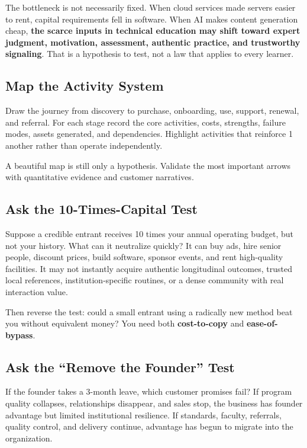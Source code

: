 The bottleneck is not necessarily fixed. When cloud services made servers easier to rent, capital requirements fell in software. When AI makes content generation cheap, \textbf{the scarce inputs in technical education may shift toward expert judgment, motivation, assessment, authentic practice, and trustworthy signaling}. That is a hypothesis to test, not a law that applies to every learner.

\subsection{Map the Activity System}
\label{sec:map_the_activity_system}

Draw the journey from discovery to purchase, onboarding, use, support, renewal, and referral. For each stage record the core activities, costs, strengths, failure modes, assets generated, and dependencies. Highlight activities that reinforce 1 another rather than operate independently.

A beautiful map is still only a hypothesis. Validate the most important arrows with quantitative evidence and customer narratives.

\subsection{Ask the 10-Times-Capital Test}
\label{sec:ten_times_capital_test}

Suppose a credible entrant receives 10 times your annual operating budget, but not your history. What can it neutralize quickly? It can buy ads, hire senior people, discount prices, build software, sponsor events, and rent high-quality facilities. It may not instantly acquire authentic longitudinal outcomes, trusted local references, institution-specific routines, or a dense community with real interaction value.

Then reverse the test: could a small entrant using a radically new method beat you without equivalent money? You need both \textbf{cost-to-copy} and \textbf{ease-of-bypass}.

\subsection{Ask the ``Remove the Founder'' Test}
\label{sec:remove_founder_test}

If the founder takes a 3-month leave, which customer promises fail? If program quality collapses, relationships disappear, and sales stop, the business has founder advantage but limited institutional resilience. If standards, faculty, referrals, quality control, and delivery continue, advantage has begun to migrate into the organization.

